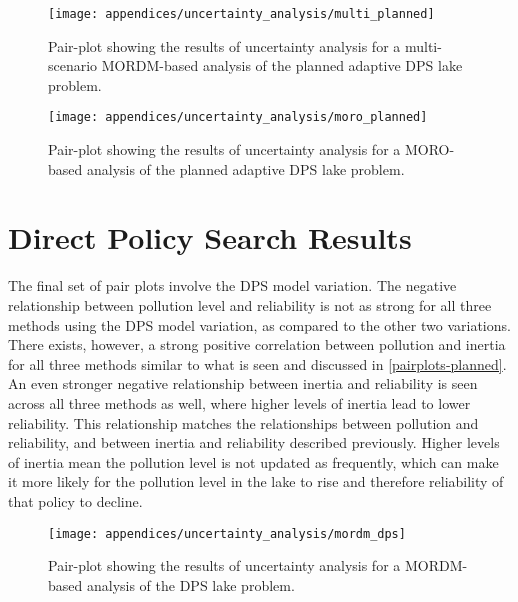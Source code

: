 \begin{figure}[H]
    \centering
    
    \texttt{[image: appendices/uncertainty\_analysis/multi\_planned]}
    \caption[Planned adaptive DPS + multi-scenario MORDM pair plot]{Pair-plot showing the results of uncertainty analysis for a multi-scenario MORDM-based analysis of the planned adaptive DPS lake problem.}
    \label{fig:pairplot-multi-planned}
\end{figure}

\begin{figure}[H]
    \centering
    
    \texttt{[image: appendices/uncertainty\_analysis/moro\_planned]}
    \caption[Planned adaptive DPS + MORO pair plot]{Pair-plot showing the results of uncertainty analysis for a MORO-based analysis of the planned adaptive DPS lake problem.}
    \label{fig:pairplot-moro-planned}
\end{figure}

\newpage

\section{Direct Policy Search Results}

The final set of pair plots involve the DPS model variation. The negative relationship between pollution level and reliability is not as strong for all three methods using the DPS model variation, as compared to the other two variations. There exists, however, a strong positive correlation between pollution and inertia for all three methods similar to what is seen and discussed in \cref{pairplots-planned}. An even stronger negative relationship between inertia and reliability is seen across all three methods as well, where higher levels of inertia lead to lower reliability. This relationship matches the relationships between pollution and reliability, and between inertia and reliability described previously. Higher levels of inertia mean the pollution level is not updated as frequently, which can make it more likely for the pollution level in the lake to rise and therefore reliability of that policy to decline.

\begin{figure}[H]
    \centering
    
    \texttt{[image: appendices/uncertainty\_analysis/mordm\_dps]}
    \caption[DPS + MORDM pair plot]{Pair-plot showing the results of uncertainty analysis for a MORDM-based analysis of the DPS lake problem.}
    \label{fig:pairplot-mordm-dps}
\end{figure}

